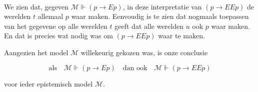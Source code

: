 \documentclass[a4paper,11pt]{article}
\begin{document}
\paragraph{}

We zien dat, gegeven $\mathcal{M} \Vdash (p \to E p)$, in deze interpretatie
van $(p \to E E p)$ de werelden $t$ allemaal $p$ waar maken. Eenvoudig is te
zien dat nogmaals toepassen van het gegevene op alle werelden $t$ geeft dat
alle werelden $u$ ook $p$ waar maken. En dat is precies wat nodig was om $(p
\to E E p)$ waar te maken.

Aangezien het model $\mathcal{M}$ willekeurig gekozen was, is onze conclusie

\begin{displaymath}
\mbox{als} \quad \mathcal{M} \Vdash (p \to E p) \quad \mbox{dan ook} \quad \mathcal{M} \Vdash(p \to E E p)
\end{displaymath}

voor ieder epistemisch model $\mathcal{M}$.






\end{document}
